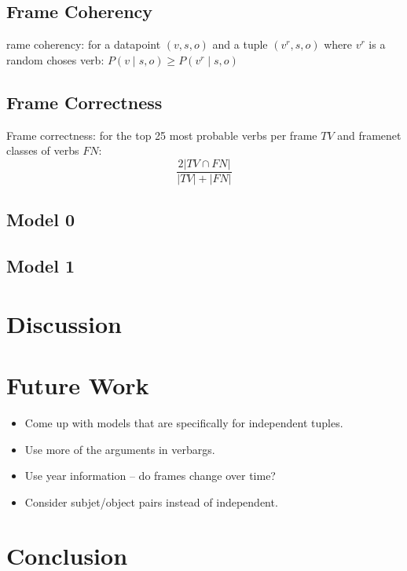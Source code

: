 \documentclass[11pt,twocolumn,DIV=11]{scrartcl}
\begin{document}
\subsection{Frame Coherency}
rame coherency: for a datapoint $(v,s,o)$ and a tuple $(v^r,s,o)$ where $v^r$ is a random choses verb: $P(v\mid s,o) \geq P(v^r\mid s,o)$  
\subsection{Frame Correctness}
Frame correctness: for the top 25 most probable verbs per frame $TV$ and framenet classes of verbs $FN$: \[\frac{2|TV\cap FN|}{|TV|+|FN|}\]
\subsection{Model 0}
\subsection{Model 1}


\section{Discussion}


\section{Future Work}
\begin{itemize}
\item Come up with models that are specifically for independent tuples.
\item Use more of the arguments in verbargs.
\item Use year information -- do frames change over time?
\item Consider subjet/object pairs instead of independent.
\end{itemize}

\section{Conclusion}



\end{document}

